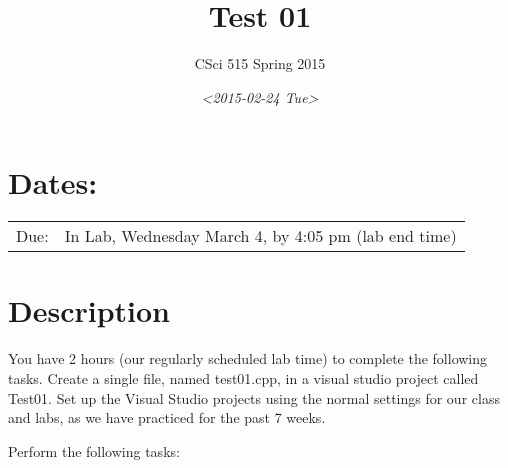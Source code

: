 \documentclass[11pt]{article}
\author{CSci 515 Spring 2015}
\date{\textit{<2015-02-24 Tue>}}
\title{Test 01}
\begin{document}
\maketitle

\section*{Dates:}
\label{sec-1}
\begin{center}
\begin{tabular}{ll}
Due: & In Lab, Wednesday March 4, by 4:05 pm (lab end time)\\
\end{tabular}
\end{center}
\section*{Description}
\label{sec-2}
You have 2 hours (our regularly scheduled lab time) to complete the
following tasks.  Create a single file, named test01.cpp, in a visual
studio project called Test01.  Set up the Visual Studio projects using
the normal settings for our class and labs, as we have practiced for
the past 7 weeks.

Perform the following tasks:
\end{document}
